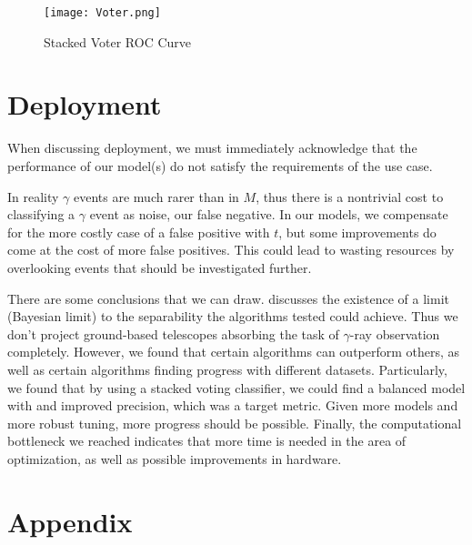 \documentclass[12pt, a4paper]{article} %
\begin{document}
\begin{figure}[!h]
    \centering
    \texttt{[image: Voter.png]} 
    \caption{Stacked Voter ROC Curve}
\end{figure}


\section{Deployment}

When discussing deployment, we must immediately acknowledge that the performance of our model(s) do not satisfy the requirements of the use case.

In reality $\gamma$ events are much rarer than in $M$, thus there is a nontrivial cost to classifying a $\gamma$ event as noise, our false negative. In our models, we compensate for the more costly case of a false positive with $t$, but some improvements do come at the cost of more false positives. This could lead to wasting resources by overlooking events that should be investigated further. 

There are some conclusions that we can draw. \cite{CaseStudy} discusses the existence of a limit (Bayesian limit) to the separability the algorithms tested could achieve. Thus we don't project ground-based telescopes absorbing the task of $\gamma$-ray observation completely. However, we found that certain algorithms can outperform others, as well as certain algorithms finding progress with different datasets. Particularly, we found that by using a stacked voting classifier, we could find a balanced model with and improved precision, which was a target metric. Given more models and more robust tuning, more progress should be possible. Finally, the computational bottleneck we reached indicates that more time is needed in the area of optimization, as well as possible improvements in hardware. 

\newpage
\printbibliography[title={Bibliography}] %


\newpage
\section*{Appendix}
\end{document}
